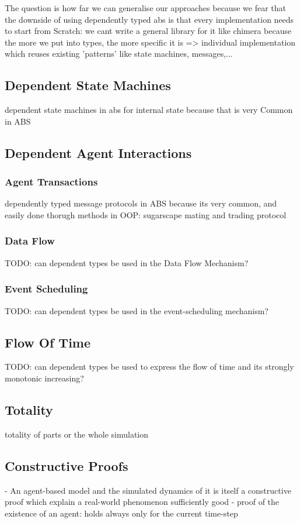 The question is how far we can generalise our approaches because we fear that the downside of using dependently typed abs is that every implementation needs to start from Scratch: we cant write a general library for it like chimera because the more we put into types, the more specific it is => individual implementation which reuses existing 'patterns' like state machines, messages,...

\subsection{Dependent State Machines}
dependent state machines in abs for internal state because that is very Common in ABS

\subsection{Dependent Agent Interactions}
\subsubsection{Agent Transactions}
dependently typed message protocols in ABS because its very common, and easily done thorugh methods in OOP: sugarscape mating and trading protocol
\subsubsection{Data Flow}
TODO: can dependent types be used in the Data Flow Mechanism?
\subsubsection{Event Scheduling}
TODO: can dependent types be used in the event-scheduling mechanism?

\subsection{Flow Of Time}
TODO: can dependent types be used to express the flow of time and its strongly monotonic increasing?

\subsection{Totality}
totality of parts or the whole simulation

\subsection{Constructive Proofs}
- An agent-based model and the simulated dynamics of it is itself a constructive proof which explain a real-world phenomenon sufficiently good
- proof of the existence of an agent: holds always only for the current time-step